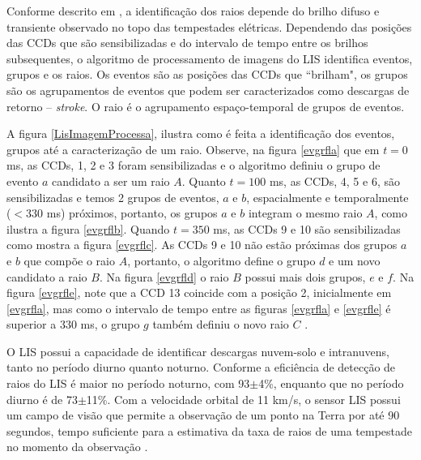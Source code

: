 

Conforme descrito em , a identificação dos raios depende do brilho difuso e transiente observado no topo das tempestades elétricas. Dependendo das posições das CCDs que são sensibilizadas e do intervalo de tempo entre os brilhos subsequentes, o algoritmo de processamento de imagens do LIS identifica  eventos, grupos e os raios. Os eventos são as posições das CCDs que ``brilham", os grupos são os agrupamentos de eventos que podem ser caracterizados como descargas de retorno -- \textit{stroke}. O raio é o agrupamento espaço-temporal de grupos de eventos.


A figura \ref{LisImagemProcessa}, ilustra como é feita a identificação dos  eventos, grupos até a caracterização de um raio. Observe, na figura \ref{evgrfla} que em $t=0$ ms, as CCDs, 1, 2 e 3  foram sensibilizadas e o algoritmo definiu o grupo de evento $a$ candidato a ser um raio $A$.  Quanto $t=100$ ms, as CCDs, 4, 5 e 6, são sensibilizadas e temos 2 grupos de eventos, $a$ e $b$, espacialmente e temporalmente ($<$330 ms) próximos, portanto, os grupos $a$ e $b$ integram o mesmo raio $A$, como ilustra a figura \ref{evgrflb}. Quando $t = 350$ ms, as CCDs 9 e 10 são sensibilizadas como mostra a figura \ref{evgrflc}. As CCDs 9 e 10 não estão próximas dos grupos $a$ e $b$ que compõe o raio $A$, portanto, o algoritmo define o grupo $d$ e um novo candidato a raio $B$. Na figura \ref{evgrfld} o raio $B$ possui mais dois grupos, $e$ e $f$. Na figura \ref{evgrfle}, note que a CCD 13 coincide com a posição 2, inicialmente em \ref{evgrfla}, mas como o intervalo de tempo entre as figuras \ref{evgrfla} e \ref{evgrfle} é superior a 330 ms, o grupo $g$ também definiu o novo raio $C$ \cite{christian2000LISalgorithm}.  

     
O LIS possui a capacidade de identificar descargas nuvem-solo e intranuvens, tanto no período diurno quanto noturno. Conforme  a eficiência de detecção de raios do LIS é maior no período noturno, com 93$\pm$4\%, enquanto que no período diurno é de 73$\pm$11\%.  Com a velocidade orbital de 11 km/s, o sensor LIS possui um campo de visão que permite a observação de um ponto na Terra por até 90 segundos, tempo suficiente para a estimativa da taxa de raios de uma tempestade no momento da observação \cite{christianTM,trmmhandbook}.

